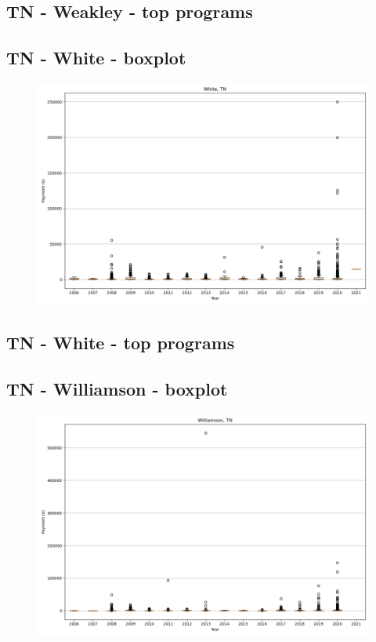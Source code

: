\subsection*{TN - Weakley - top programs}

\newpage
\subsection*{TN - White - boxplot}
\begin{figure}[h]
\centering
\includegraphics[width=7in]{../output/boxplots/counties/White-TN_boxplot.png}
\end{figure}


\subsection*{TN - White - top programs}

\newpage
\subsection*{TN - Williamson - boxplot}
\begin{figure}[h]
\centering
\includegraphics[width=7in]{../output/boxplots/counties/Williamson-TN_boxplot.png}
\end{figure}


